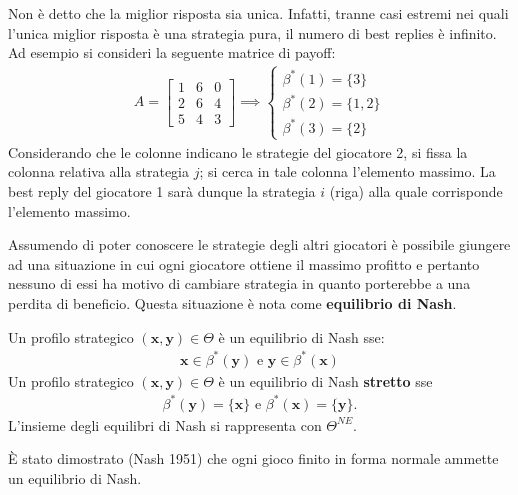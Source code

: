 Non è detto che la miglior risposta sia unica. Infatti, tranne casi estremi nei quali l'unica miglior risposta è una strategia pura, il numero di best replies è infinito. Ad esempio si consideri la seguente matrice di payoff:
\begin{align*}
    A =
    \begin{bmatrix}
        1 & 6 & 0 \\
        2 & 6 & 4 \\
        5 & 4 & 3
    \end{bmatrix}
    \implies
    \begin{cases}
        \beta^*(1) = \{3\} \\
        \beta^*(2) = \{1,2\} \\
        \beta^*(3) = \{2\}
    \end{cases}
\end{align*}
Considerando che le colonne indicano le strategie del giocatore 2, si fissa la colonna relativa alla strategia $j$; si cerca in tale colonna l’elemento massimo. La best reply del giocatore 1 sarà dunque la strategia $i$ (riga) alla quale corrisponde l’elemento massimo. 

\newpage

Assumendo di poter conoscere le strategie degli altri giocatori è possibile giungere ad una situazione in cui ogni giocatore ottiene il massimo profitto e pertanto nessuno di essi ha motivo di cambiare strategia in quanto porterebbe a una perdita di beneficio. Questa situazione è nota come \textbf{equilibrio di Nash}.

\begin{thm} Un profilo strategico $(\mathbf{x},\mathbf{y}) \in \Theta$ è un equilibrio di Nash sse:
\begin{align*}
    \mathbf{x} \in \beta^*(\mathbf{y}) \text{ e } \mathbf{y} \in \beta^*(\mathbf{x})
\end{align*}
Un profilo strategico $(\mathbf{x},\mathbf{y}) \in \Theta$ è un equilibrio di Nash \textbf{stretto} sse 
\begin{align*}
    \beta^*(\mathbf{y}) = \{ \mathbf{x}\} \text{ e } \beta^*(\mathbf{x}) = \{ \mathbf{y}\}.
\end{align*}
L'insieme degli equilibri di Nash si rappresenta con $\Theta^{NE}$.
\end{thm}

È stato dimostrato (Nash 1951) che ogni gioco finito in forma normale ammette un equilibrio di Nash.


